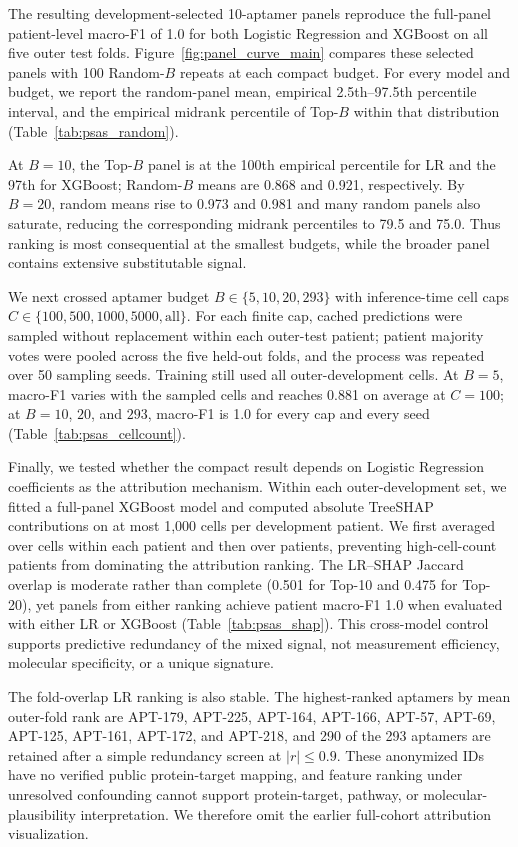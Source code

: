 The resulting development-selected 10-aptamer panels reproduce the full-panel patient-level macro-F1 of 1.0 for both Logistic Regression and XGBoost on all five outer test folds. Figure~\ref{fig:panel_curve_main} compares these selected panels with 100 Random-$B$ repeats at each compact budget. For every model and budget, we report the random-panel mean, empirical 2.5th--97.5th percentile interval, and the empirical midrank percentile of Top-$B$ within that distribution (Table~\ref{tab:psas_random}).





At $B=10$, the Top-$B$ panel is at the 100th empirical percentile for LR and the 97th for XGBoost; Random-$B$ means are 0.868 and 0.921, respectively. By $B=20$, random means rise to 0.973 and 0.981 and many random panels also saturate, reducing the corresponding midrank percentiles to 79.5 and 75.0. Thus ranking is most consequential at the smallest budgets, while the broader panel contains extensive substitutable signal.

We next crossed aptamer budget $B\in\{5,10,20,293\}$ with inference-time cell caps $C\in\{100,500,1000,5000,\mathrm{all}\}$. For each finite cap, cached predictions were sampled without replacement within each outer-test patient; patient majority votes were pooled across the five held-out folds, and the process was repeated over 50 sampling seeds. Training still used all outer-development cells. At $B=5$, macro-F1 varies with the sampled cells and reaches 0.881 on average at $C=100$; at $B=10$, $20$, and $293$, macro-F1 is 1.0 for every cap and every seed (Table~\ref{tab:psas_cellcount}).



Finally, we tested whether the compact result depends on Logistic Regression coefficients as the attribution mechanism. Within each outer-development set, we fitted a full-panel XGBoost model and computed absolute TreeSHAP contributions on at most 1,000 cells per development patient. We first averaged over cells within each patient and then over patients, preventing high-cell-count patients from dominating the attribution ranking. The LR--SHAP Jaccard overlap is moderate rather than complete (0.501 for Top-10 and 0.475 for Top-20), yet panels from either ranking achieve patient macro-F1 1.0 when evaluated with either LR or XGBoost (Table~\ref{tab:psas_shap}). This cross-model control supports predictive redundancy of the mixed signal, not measurement efficiency, molecular specificity, or a unique signature.



The fold-overlap LR ranking is also stable. The highest-ranked aptamers by mean outer-fold rank are APT-179, APT-225, APT-164, APT-166, APT-57, APT-69, APT-125, APT-161, APT-172, and APT-218, and 290 of the 293 aptamers are retained after a simple redundancy screen at $|r| \le 0.9$. These anonymized IDs have no verified public protein-target mapping, and feature ranking under unresolved confounding cannot support protein-target, pathway, or molecular-plausibility interpretation. We therefore omit the earlier full-cohort attribution visualization.

